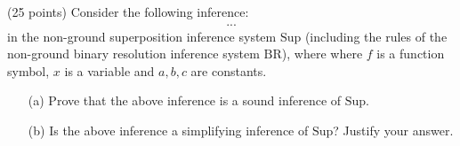 \documentclass{article}[8pt]
\begin{document}


 (25 points)
Consider the following inference:
\[
\begin{array}{l}
 ... \end{array}
\]
in the non-ground
superposition inference system $\textrm{Sup}$ (including the rules of the non-ground
binary resolution  inference system $\textrm{BR}$), where
where $f$ is a function symbol, %
$x$ is a variable and $a,b,c$ are
constants.  %
%

          \begin{itemize}
            \item[(a)] Prove that the above inference is a sound
              inference of $\textrm{Sup}$.
            \item[(b)] Is the above inference a simplifying inference
              of $\textrm{Sup}$?
              Justify your answer.
\end{itemize}
\end{document}
